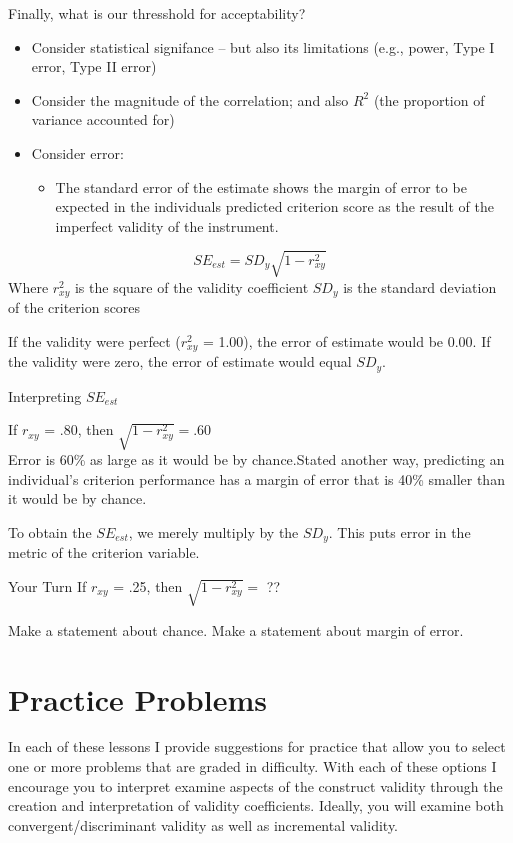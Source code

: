 \documentclass[
  english,
]{book}
\providecommand{\tightlist}{%
  \setlength{\itemsep}{0pt}\setlength{\parskip}{0pt}}
\begin{document}
Finally, what is our thresshold for acceptability?

\begin{itemize}
\tightlist
\item
  Consider statistical signifance -- but also its limitations (e.g., power, Type I error, Type II error)
\item
  Consider the magnitude of the correlation; and also \(R^2\) (the proportion of variance accounted for)
\item
  Consider error:

  \begin{itemize}
  \tightlist
  \item
    The standard error of the estimate shows the margin of error to be expected in the individuals predicted criterion score as the result of the imperfect validity of the instrument.
  \end{itemize}
\end{itemize}

\[SE_{est} = SD_{y}\sqrt{1 - r_{xy}^{2}}\]
Where
\(r_{xy}^{2}\) is the square of the validity coefficient
\(SD_{y}\) is the standard deviation of the criterion scores

If the validity were perfect (\(r_{xy}^{2}\) = 1.00), the error of estimate would be 0.00.
If the validity were zero, the error of estimate would equal \(SD_{y}\).

Interpreting \(SE_{est}\)

If \(r_{xy}\) = .80, then \(\sqrt{1 - r_{xy}^{2}} = .60\)\\
Error is 60\% as large as it would be by chance.Stated another way, predicting an individual's criterion performance has a margin of error that is 40\% smaller than it would be by chance.

To obtain the \(SE_{est}\), we merely multiply by the \(SD_{y}\). This puts error in the metric of the criterion variable.

Your Turn
If \(r_{xy}\) = .25, then \(\sqrt{1 - r_{xy}^{2}} =\) ??

Make a statement about chance.
Make a statement about margin of error.

\hypertarget{practice-problems-2}{%
\section{Practice Problems}\label{practice-problems-2}}

In each of these lessons I provide suggestions for practice that allow you to select one or more problems that are graded in difficulty. With each of these options I encourage you to interpret examine aspects of the construct validity through the creation and interpretation of validity coefficients. Ideally, you will examine both convergent/discriminant validity as well as incremental validity.
\end{document}
